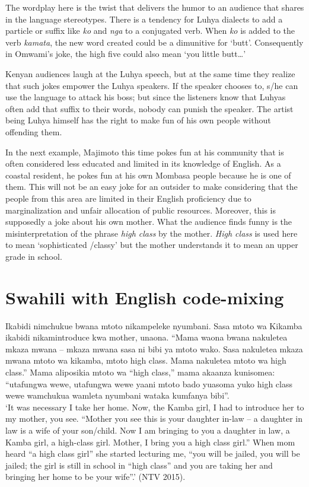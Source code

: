\documentclass[output=paper]{langsci/langscibook}
\begin{document}
The wordplay here is the twist that delivers the humor to an audience that shares in the language stereotypes. There is a tendency for Luhya dialects to add a particle or suffix like \textit{ko} and \textit{nga} to a conjugated verb. When \textit{ko} is added to the verb \textit{kamata}, the new word created could be a dimunitive for ‘butt’. Consequently in Omwami’s joke, the high five could also mean ‘you little butt…’

   Kenyan audiences laugh at the Luhya speech, but at the same time they realize that such jokes empower the Luhya speakers. If the speaker chooses to, s/he can use the language to attack his boss; but since the listeners know that Luhyas often add that suffix to their words, nobody can punish the speaker. The artist being Luhya himself has the right to make fun of his own people without offending them. 

In the next example, Majimoto this time pokes fun at his community that is often considered less educated and limited in its knowledge of English. As a coastal resident, he pokes fun at his own Mombasa people because he is one of them. This will not be an easy joke for an outsider to make considering that the people from this area are limited in their English proficiency due to marginalization and unfair allocation of public resources. Moreover, this is supposedly a joke about his own mother. What the audience finds funny is the misinterpretation of the phrase \textit{high class} by the mother. \textit{High class} is used here to mean ‘sophisticated /classy’ but the mother understands it to mean an upper grade in school. 

\chapter{Swahili with English code-mixing}
\gll Ikabidi nimchukue bwana mtoto nikampeleke nyumbani. Sasa mtoto wa Kikamba ikabidi nikamintroduce kwa mother, unaona. “Mama waona bwana nakuletea mkaza mwana – mkaza mwana sasa ni bibi ya mtoto wako. Sasa nakuletea mkaza mwana mtoto wa kikamba, mtoto high class. Mama nakuletea mtoto wa high class.” Mama aliposikia mtoto wa “high class,” mama akaanza kunisomea: “utafungwa wewe, utafungwa wewe yaani mtoto bado yuasoma yuko high class wewe wamchukua wamleta nyumbani wataka kumfanya bibi”.\\
\glt ‘It was necessary I take her home. Now, the Kamba girl, I had to introduce her to my mother, you see. “Mother you see this is your daughter in-law – a daughter in law is a wife of your son/child. Now I am bringing to you a daughter in law, a Kamba girl, a high-class girl. Mother, I bring you a high class girl.” When mom heard “a high class girl” she started lecturing me, “you will be jailed, you will be jailed; the girl is still in school in “high class” and you are taking her and bringing her home to be your wife”.’ (NTV 2015).
\z
\end{document}
